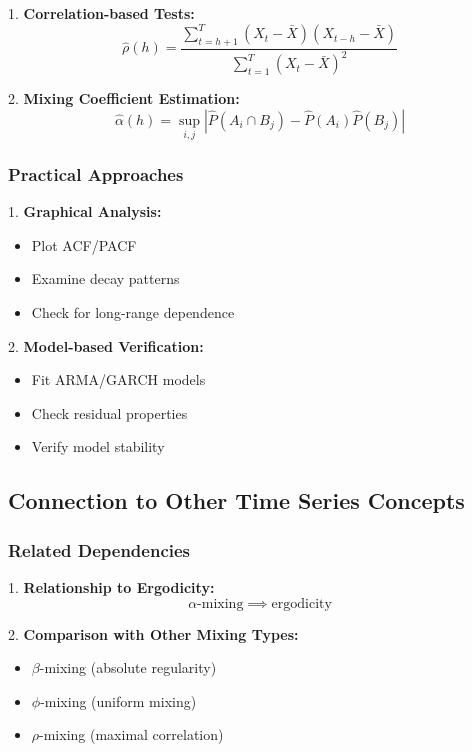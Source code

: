 \documentclass[12pt,article]{memoir}
\begin{document}
1. \textbf{Correlation-based Tests:}
\begin{equation}
    \hat{\rho}(h) = \frac{\sum_{t=h+1}^T (X_t - \bar{X})(X_{t-h} - \bar{X})}{\sum_{t=1}^T (X_t - \bar{X})^2}
\end{equation}

2. \textbf{Mixing Coefficient Estimation:}
\begin{equation}
    \hat{\alpha}(h) = \sup_{i,j} |\hat{P}(A_i \cap B_j) - \hat{P}(A_i)\hat{P}(B_j)|
\end{equation}

\subsubsection{Practical Approaches}

1. \textbf{Graphical Analysis:}
   \begin{itemize}
       \item Plot ACF/PACF
       \item Examine decay patterns
       \item Check for long-range dependence
   \end{itemize}

2. \textbf{Model-based Verification:}
   \begin{itemize}
       \item Fit ARMA/GARCH models
       \item Check residual properties
       \item Verify model stability
   \end{itemize}

\subsection{Connection to Other Time Series Concepts}

\subsubsection{Related Dependencies}

1. \textbf{Relationship to Ergodicity:}
\begin{equation}
    \text{$\alpha$-mixing} \implies \text{ergodicity}
\end{equation}

2. \textbf{Comparison with Other Mixing Types:}
   \begin{itemize}
       \item $\beta$-mixing (absolute regularity)
       \item $\phi$-mixing (uniform mixing)
       \item $\rho$-mixing (maximal correlation)
   \end{itemize}
\end{document}
